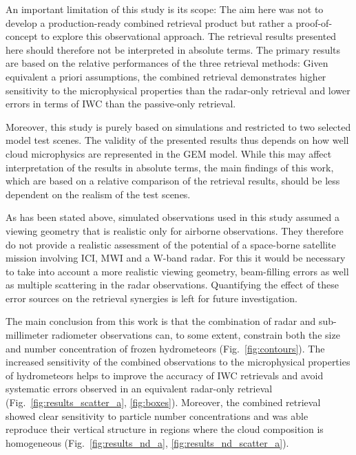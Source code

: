 \documentclass[journal abbreviation, manuscript]{copernicus}
\begin{document}
An important limitation of this study is its scope: The aim here was not to
develop a production-ready combined retrieval product but rather a
proof-of-concept to explore this observational approach. The retrieval results
presented here should therefore not be interpreted in absolute terms. The
primary results are based on the relative performances of the three retrieval
methods: Given equivalent a priori assumptions, the combined retrieval
demonstrates higher sensitivity to the microphysical properties than the
radar-only retrieval and lower errors in terms of IWC than the passive-only
retrieval.

Moreover, this study is purely based on simulations and restricted to two
selected model test scenes. The validity of the presented results thus depends
on how well cloud microphysics are represented in the GEM model. While this may
affect interpretation of the results in absolute terms, the main findings of
this work, which are based on a relative comparison of the retrieval results,
should be less dependent on the realism of the test scenes.

As has been stated above, simulated observations used in this study assumed a
viewing geometry that is realistic only for airborne observations. They
therefore do not provide a realistic assessment of the potential of a
space-borne satellite mission involving ICI, MWI and a W-band radar. For this it
would be necessary to take into account a more realistic viewing geometry,
beam-filling errors as well as multiple scattering in the radar observations.
Quantifying the effect of these error sources on the retrieval synergies is
left for future investigation.

\conclusions  %
\label{sec:conclusions}

The main conclusion from this work is that the combination of radar and
sub-millimeter radiometer observations can, to some extent, constrain both the
size and number concentration of frozen hydrometeors (Fig.~\ref{fig:contours}).
The increased sensitivity of the combined observations to the microphysical
properties of hydrometeors helps to improve the accuracy of IWC retrievals and
avoid systematic errors observed in an equivalent radar-only retrieval
(Fig.~\ref{fig:results_scatter_a}, \ref{fig:boxes}). Moreover, the combined
retrieval showed clear sensitivity to particle number concentrations and was
able reproduce their vertical structure in regions where the cloud composition
is homogeneous (Fig.~\ref{fig:results_nd_a}, \ref{fig:results_nd_scatter_a}).
\end{document}

